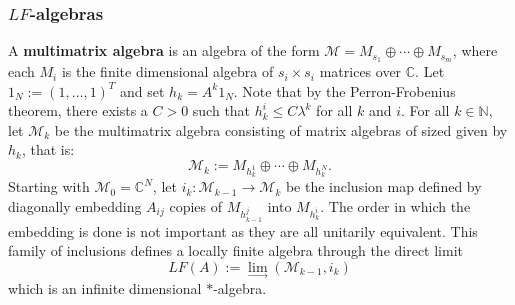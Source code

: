 \documentclass[12pt]{amsart}
\theoremstyle{plain}
\theoremstyle{definition}
\begin{document}
\subsubsection{$LF$-algebras}
\label{subsubsec:LF}
A \textbf{multimatrix algebra }is an algebra of the form $\mathcal{M} = M_{s_1}\oplus \cdots \oplus M_{s_m}$, where each $M_i$ is the finite dimensional algebra of $s_i\times s_i$ matrices over $\mathbb{C}$. Let $1_N := (1,\dots, 1)^T$ and set $h_k = A^k 1_N$. Note that by the Perron-Frobenius theorem, there exists a $C>0$ such that $h_k^i\leq C \lambda^k$ for all $k$ and $i$. For all $k\in\mathbb{N}$, let $\mathcal{M}_k $ be the multimatrix algebra consisting of matrix algebras of sized given by $h_k$, that is:
$$\mathcal{M}_k  := M_{h_k^1}\oplus \cdots  \oplus M_{h_k^N}.$$
Starting with $\mathcal{M}_0  = \mathbb{C}^N$, let $i_k:\mathcal{M}_{k-1} \rightarrow \mathcal{M}_k $ be the inclusion map defined by diagonally embedding $A_{ij}$ copies of $M_{h_{k-1}^j}$ into $M_{h_{k}^i}$. The order in which the embedding is done is not important as they are all unitarily equivalent. This family of inclusions defines a locally finite algebra through the direct limit
$$LF (A):= \lim_{\rightarrow} \left(\mathcal{M}_{k-1} ,i_k\right)$$
which is an infinite dimensional $*$-algebra.
\end{document}
